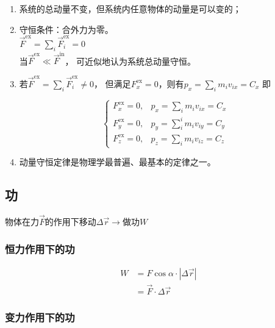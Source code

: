\documentclass[
	12pt, %
	a4paper, %
]{myLegrandOrangeBook}
\begin{document}
\begin{enumerate}
    \item 系统的总动量不变，但系统内任意物体的动量是可以变的；
    \item 守恒条件：合外力为零。\\
        \(\overrightarrow{F}^{\mathrm{ex}} = \sum_i \overrightarrow{F}_i^{\mathrm{ex}}= 0\)\\
        当\(\overrightarrow{F}^{\mathrm{ex}} \ll \overrightarrow{F}^{\mathrm{in}}\)，
        可近似地认为系统总动量守恒。
    \item 若\(\overrightarrow{F}^{\mathrm{ex}} = \sum_i \overrightarrow{F}_i^{\mathrm{ex}}\neq 0\)，
        但满足\(F_{x}^{\mathrm{ex}} = 0\)，则有$p_x=\sum_i m_i v_{i x}=C_x$
        即

        \begin{equation}
            \begin{cases}F_x^{\mathrm{ex}}=0, & p_x=\sum_i m_i v_{i x}=C_x \\
            F_y^{\mathrm{ex}}=0, & p_y=\sum_i^i m_i v_{i y}=C_y \\
            F_z^{\mathrm{ex}}=0, & p_z=\sum_i m_i v_{i z}=C_z\end{cases}
        \end{equation}
    \item 动量守恒定律是物理学最普遍、最基本的定律之一。
\end{enumerate}

\subsection{功}

物体在力\(\overrightarrow{F}\)的作用下移动\(\Delta \overrightarrow{r} \rightarrow\)做功\(W\)

\subsubsection{恒力作用下的功}

\begin{equation}
    \begin{aligned}
    W & =F \cos \alpha \cdot|\Delta \overrightarrow{r}| \\
    & =\overrightarrow{F} \cdot \Delta \overrightarrow{r}
    \end{aligned}
\end{equation}

\subsubsection{变力作用下的功}
\end{document}
